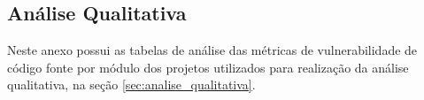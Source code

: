 \begin{apendicesenv}
\chapter{Análise Qualitativa} \label{anex:analise_qualitativa}

Neste anexo possui as tabelas de análise das métricas de vulnerabilidade de código fonte por módulo
dos projetos utilizados para realização da análise qualitativa, na seção \ref{sec:analise_qualitativa}.


\begin{table}[h]
\caption{Projeto Bash}
\end{table}




\end{apendicesenv}
